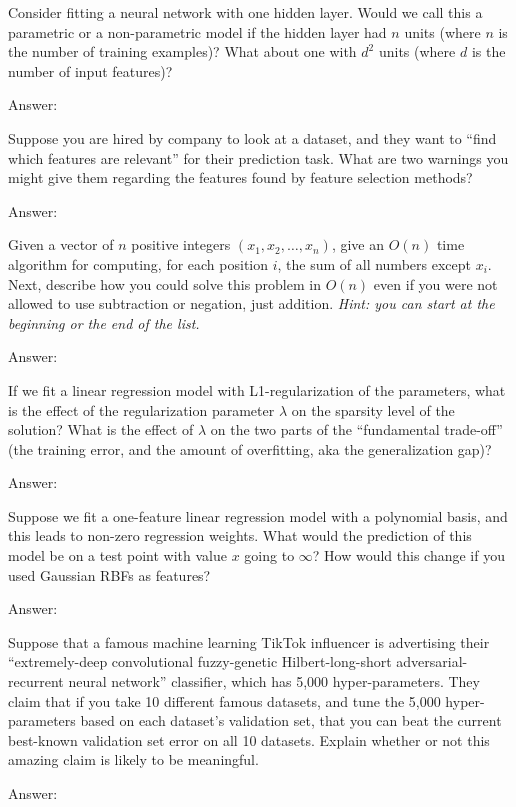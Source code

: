 \documentclass{article}
\newcommand{\ask}[1]{\textcolor{question}{#1}}
\newenvironment{answer}{\par\begingroup\color{answer}Answer: }{\endgroup}
\newcommand{\hint}[1]{\textcolor{black!60!white}{\emph{Hint: #1}}}
\newcommand{\TODO}{\color{red}{TODO}}
\begin{document}
\begin{qlist}
\item Consider fitting a neural network with one hidden layer. Would we call this a parametric or a non-parametric model \ask{if the hidden layer had $n$ units} (where $n$ is the number of training examples)? \ask{What about one with $d^2$ units} (where $d$ is the number of input features)?
\begin{answer}\TODO\end{answer}

\item Suppose you are hired by company to look at a dataset, and they want to ``find which features are relevant'' for their prediction task. \ask{What are two warnings you might give them regarding the features found by feature selection methods?}
\begin{answer}\TODO\end{answer}

\item Given a vector of $n$ positive integers $(x_1,x_2,\dots,x_n)$, \ask{give an $O(n)$ time algorithm for computing, for each position $i$, the sum of all numbers except $x_i$}. Next, \ask{describe how you could solve this problem in $O(n)$ even if you were not allowed to use subtraction or negation}, just addition. \hint{you can start at the beginning or the end of the list.}
\begin{answer}\TODO\end{answer}

\item If we fit a linear regression model with L1-regularization of the parameters, \ask{what is the effect of the regularization parameter $\lambda$ on the sparsity level of the solution? What is the effect of $\lambda$ on the two parts of the ``fundamental trade-off''} (the training error, and the amount of overfitting, aka the generalization gap)?
\begin{answer}\TODO\end{answer}

\item Suppose we fit a one-feature linear regression model with a polynomial basis, and this leads to non-zero regression weights. \ask{What would the prediction of this model be on a test point with value $x$ going to $\infty$? How would this change if you used Gaussian RBFs as features?}
\begin{answer}\TODO\end{answer}

\item Suppose that a famous machine learning TikTok influencer is advertising their  ``extremely-deep convolutional fuzzy-genetic Hilbert-long-short adversarial-recurrent neural network'' classifier, which has 5,000 hyper-parameters. They claim that if you take 10 different famous datasets, and tune the 5,000 hyper-parameters based on each dataset's validation set, that you can beat the current best-known validation set error on all 10 datasets. \ask{Explain whether or not this amazing claim is likely to be meaningful.}
\begin{answer}\TODO\end{answer}


\end{qlist}
\end{document}
